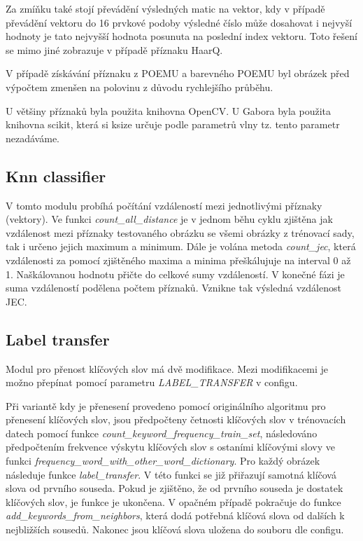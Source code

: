 \documentclass[czech,BP]{thesiskiv}
\begin{document}
\par Za zmíňku také stojí převádění výsledných matic na vektor, kdy v případě převádění vektoru do 16 prvkové podoby výsledné číslo může dosahovat i nejvyší hodnoty je tato nejvyšší hodnota posunuta na poslední index vektoru. Toto řešení se mimo jiné zobrazuje v případě příznaku HaarQ. 

\par V případě získávání příznaku z POEMU a barevného POEMU byl obrázek před výpočtem zmenšen na polovinu z důvodu rychlejšího průběhu.

\par U většiny příznaků byla použita knihovna OpenCV. U Gabora byla použita knihovna scikit, která si ksize určuje podle parametrů vlny tz. tento parametr nezadáváme.
   
  
\subsection{Knn classifier}
\par V tomto modulu probíhá počítání vzdáleností mezi jednotlivými příznaky (vektory). Ve funkci \textit{count\_all\_distance} je v jednom běhu cyklu zjištěna jak vzdálenost mezi příznaky testovaného obrázku se všemi obrázky z trénovací sady, tak i určeno jejich maximum a minimum. Dále je volána metoda \textit{count\_jec}, která vzdálenosti za pomocí zjištěného maxima a minima přeškálujuje na interval 0 až 1. Naškálovanou hodnotu přičte do celkové sumy vzdáleností. V konečné fázi je suma vzdáleností podělena počtem příznaků. Vznikne tak výsledná vzdálenost JEC.
    

\subsection{Label transfer}
\par Modul pro přenost klíčových slov má dvě modifikace. Mezi modifikacemi je možno přepínat pomocí parametru \textit{LABEL\_TRANSFER} v configu. 

\par Při variantě kdy je přenesení provedeno pomocí originálního algoritmu pro přenesení klíčových slov, jsou předpočteny četnosti klíčových slov v trénovacích datech pomocí funkce \textit{count\_keyword\_frequency\_train\_set}, následováno předpočtením frekvence výskytu klíčových slov s ostaními klíčovými slovy ve funkci \textit{frequency\_word\_with\_other\_word\_dictionary}. Pro každý obrázek následuje funkce \textit{label\_transfer}. V této funkci se již přiřazují samotná klíčová slova od prvního souseda. Pokud je zjištěno, že od prvního souseda je dostatek klíčových slov, je funkce je ukončena. V opačném případě pokračuje do funkce \textit{add\_keywords\_from\_neighbors}, která dodá potřebná klíčová slova od dalších k nejbližších sousedů. Nakonec jsou klíčová slova uložena do souboru dle configu.
\end{document}

